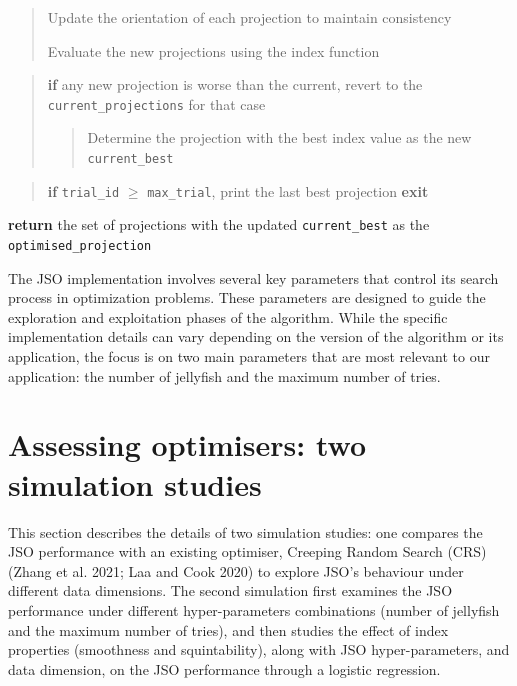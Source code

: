 \documentclass[
  12pt,
]{interact}
\theoremstyle{plain}
\begin{document}
\begin{tcolorbox}
\begin{quote}
Update the orientation of each projection to maintain consistency

Evaluate the new projections using the index function
\end{quote}

\begin{quote}
\textbf{if} any new projection is worse than the current, revert to the
\texttt{current\_projections} for that case

\begin{quote}
Determine the projection with the best index value as the new
\texttt{current\_best}
\end{quote}
\end{quote}

\begin{quote}
\textbf{if} \texttt{trial\_id} \(\ge\) \texttt{max\_trial}, print the
last best projection \textbf{exit}
\end{quote}

\textbf{return} the set of projections with the updated
\texttt{current\_best} as the \texttt{optimised\_projection}

\end{tcolorbox}

The JSO implementation involves several key parameters that control its
search process in optimization problems. These parameters are designed
to guide the exploration and exploitation phases of the algorithm. While
the specific implementation details can vary depending on the version of
the algorithm or its application, the focus is on two main parameters
that are most relevant to our application: the number of jellyfish and
the maximum number of tries.

\section{Assessing optimisers: two simulation
studies}\label{sec-sim-deets}

This section describes the details of two simulation studies: one
compares the JSO performance with an existing optimiser, Creeping Random
Search (CRS) (Zhang et al. 2021; Laa and Cook 2020) to explore JSO's
behaviour under different data dimensions. The second simulation first
examines the JSO performance under different hyper-parameters
combinations (number of jellyfish and the maximum number of tries), and
then studies the effect of index properties (smoothness and
squintability), along with JSO hyper-parameters, and data dimension, on
the JSO performance through a logistic regression.
\end{document}
